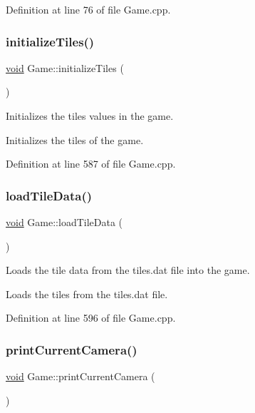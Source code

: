 Definition at line 76 of file Game.\+cpp.

\mbox{\label{class_game_af40023a23183414d0d15535b9b239c11}} 
\subsubsection{\texorpdfstring{initializeTiles()}{initializeTiles()}}
{\footnotesize\ttfamily \mbox{\hyperlink{_s_d_l__opengles2__gl2ext_8h_ae5d8fa23ad07c48bb609509eae494c95}{void}} Game\+::initialize\+Tiles (\begin{DoxyParamCaption}{ }\end{DoxyParamCaption})}



Initializes the tiles values in the game. 

Initializes the tiles of the game. 

Definition at line 587 of file Game.\+cpp.

\mbox{\label{class_game_a86c008fa563e8dd80dab8b35305109a2}} 
\subsubsection{\texorpdfstring{loadTileData()}{loadTileData()}}
{\footnotesize\ttfamily \mbox{\hyperlink{_s_d_l__opengles2__gl2ext_8h_ae5d8fa23ad07c48bb609509eae494c95}{void}} Game\+::load\+Tile\+Data (\begin{DoxyParamCaption}{ }\end{DoxyParamCaption})}



Loads the tile data from the tiles.\+dat file into the game. 

Loads the tiles from the tiles.\+dat file. 

Definition at line 596 of file Game.\+cpp.

\mbox{\label{class_game_a0aa4abcb959f9b7c4774fac5cb5f2162}} 
\subsubsection{\texorpdfstring{printCurrentCamera()}{printCurrentCamera()}}
{\footnotesize\ttfamily \mbox{\hyperlink{_s_d_l__opengles2__gl2ext_8h_ae5d8fa23ad07c48bb609509eae494c95}{void}} Game\+::print\+Current\+Camera (\begin{DoxyParamCaption}{ }\end{DoxyParamCaption})}




